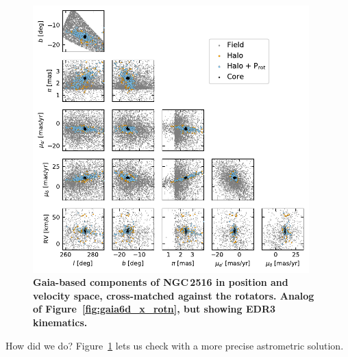 \documentclass[12pt,twocolumn,tighten]{aastex63}
\begin{document}
\begin{figure}[t]
	\begin{center}
		\leavevmode
		\includegraphics[width=0.95\textwidth]{f7.pdf}
	\end{center}
	\vspace{-0.7cm}
	\caption{ {\bf Gaia-based components of NGC\,2516 in position and
    velocity space, cross-matched against the rotators. Analog of
    Figure~\ref{fig:gaia6d_x_rotn}, but showing EDR3 kinematics.}
		\label{fig:gaia6d_x_rotn_EDR3}
	}
\end{figure}

How did we do?
Figure~\ref{fig:gaia6d_x_rotn_EDR3} lets us check with a more precise
astrometric solution.






\listofchanges

\end{document}
